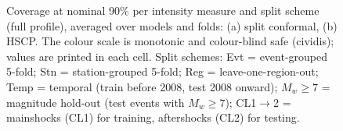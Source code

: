 \begin{figure}[htbp]
\centering
{}
\caption{Coverage at nominal 90\% per intensity measure and split scheme (full profile), averaged over models and folds: (a) split conformal, (b) HSCP. The colour scale is monotonic and colour-blind safe (cividis); values are printed in each cell. Split schemes: Evt = event-grouped 5-fold; Stn = station-grouped 5-fold; Reg = leave-one-region-out; Temp = temporal (train before 2008, test 2008 onward); $M_w{\geq}7$ = magnitude hold-out (test events with $M_w \geq 7$); CL1$\rightarrow$2 = mainshocks (CL1) for training, aftershocks (CL2) for testing.}
\label{fig:figS2_period_coverage_heatmap}
\end{figure}
